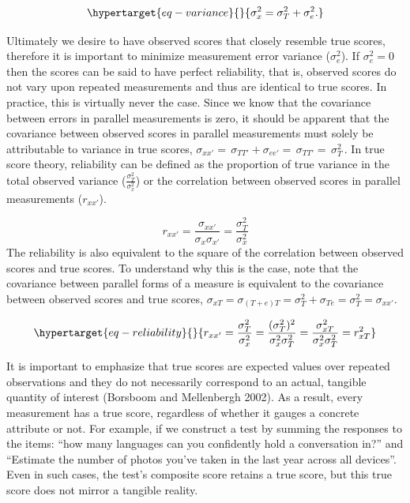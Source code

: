 \documentclass[
  letterpaper,
  DIV=11,
  numbers=noendperiod]{scrreprt}
\begin{document}
\begin{equation}\protect\hypertarget{eq-variance}{}{
\sigma_{x}^2 = \sigma_T^2 + \sigma_{e}^2.
}\label{eq-variance}\end{equation}

Ultimately we desire to have observed scores that closely resemble true
scores, therefore it is important to minimize measurement error variance
(\(\sigma^2_e\)). If \(\sigma_{e}^2 = 0\) then the scores can be said to
have perfect reliability, that is, observed scores do not vary upon
repeated measurements and thus are identical to true scores. In
practice, this is virtually never the case. Since we know that the
covariance between errors in parallel measurements is zero, it should be
apparent that the covariance between observed scores in parallel
measurements must solely be attributable to variance in true scores,
\(\sigma_{xx'}=\,\)\(\sigma_{TT'} + \sigma_{ee'}=\,\)\(\sigma_{TT'}=\,\)\(\sigma_T^2\,\).
In true score theory, reliability can be defined as the proportion of
true variance in the total observed variance
(\(\frac{\sigma_T^2}{\sigma_x^2}\)) or the correlation between observed
scores in parallel measurements (\(r_{xx'}\)).

\[
r_{xx'}=\frac{\sigma_{xx'}}{\sigma_x\sigma_{x'}}  = \frac{\sigma_T^2}{\sigma^2_{x}}
\] The reliability is also equivalent to the square of the correlation
between observed scores and true scores. To understand why this is the
case, note that the covariance between parallel forms of a measure is
equivalent to the covariance between observed scores and true scores,
\(\sigma_{xT}=\)\(\sigma_{(T+e)T}=\)\(\sigma^2_T + \sigma_{Te}=\)\(\sigma^2_T = \sigma_{xx'}\).

\begin{equation}\protect\hypertarget{eq-reliability}{}{
r_{xx'} = \frac{\sigma_T^2}{\sigma_{x}^2} = \frac{(\sigma_T^2)^2}{\sigma_x^2 \sigma_T^2}= \frac{\sigma_{xT}^2}{\sigma^2_x\sigma^2_T} = r^2_{xT}
}\label{eq-reliability}\end{equation}

It is important to emphasize that true scores are expected values over
repeated observations and they do not necessarily correspond to an
actual, tangible quantity of interest (Borsboom and Mellenbergh 2002).
As a result, every measurement has a true score, regardless of whether
it gauges a concrete attribute or not. For example, if we construct a
test by summing the responses to the items: ``how many languages can you
confidently hold a conversation in?'' and ``Estimate the number of
photos you've taken in the last year across all devices''. Even in such
cases, the test's composite score retains a true score, but this true
score does not mirror a tangible reality.
\end{document}
